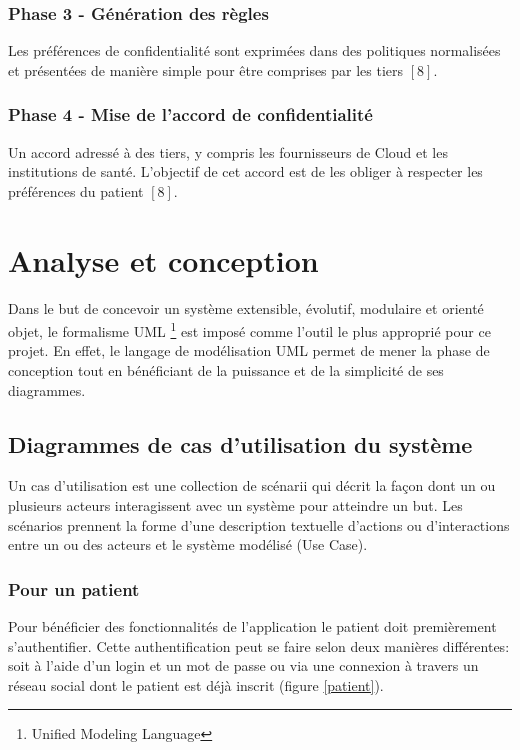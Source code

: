 \subsubsection{Phase 3 - Génération des règles}

Les préférences de confidentialité sont exprimées dans des politiques normalisées et présentées de manière simple pour être comprises par les tiers $[8]$.

\subsubsection{Phase 4 - Mise de l'accord de confidentialité}

Un accord adressé à des tiers, y compris les fournisseurs de Cloud et les institutions de santé. L'objectif de cet accord est de les obliger à respecter les préférences du patient $[8]$.

\section{Analyse et conception}

Dans le but de concevoir un système extensible, évolutif, modulaire et orienté objet, le formalisme UML \footnote{Unified Modeling Language} est imposé comme l’outil le plus approprié pour ce projet. En effet, le langage de modélisation UML permet de mener la phase de conception tout en bénéficiant de la puissance et de la simplicité de ses diagrammes.

\subsection{Diagrammes de cas d’utilisation du système}

Un cas d’utilisation est une collection de scénarii qui décrit la façon dont un ou plusieurs acteurs interagissent avec un système pour atteindre un but. Les scénarios prennent la forme d’une description textuelle d’actions ou d’interactions entre un ou des acteurs et le système modélisé (Use Case).

\subsubsection{Pour un patient}

Pour bénéficier des fonctionnalités de l’application le patient doit premièrement s’authentifier. Cette authentification peut se faire selon deux manières différentes: soit à l’aide d’un login et un mot de passe ou via une connexion à travers un réseau social dont le patient est déjà inscrit (figure \ref{patient}).


